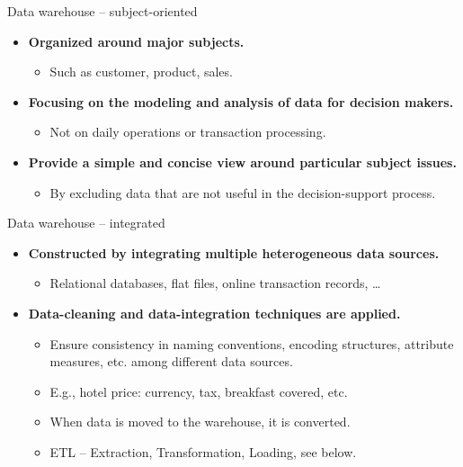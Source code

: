 \documentclass[aspectratio=169,t]{beamer}
\begin{document}
  { 
    \begin{frame}{Data warehouse -- subject-oriented}
        \begin{itemize}
            \item \textbf{Organized around major subjects.}
            \begin{itemize}
              \item Such as customer, product, sales.
            \end{itemize}
            \item \textbf{Focusing on the modeling and analysis of data for {\color{airforceblue}decision makers}.}
            \begin{itemize}
              \item Not on daily operations or transaction processing.
            \end{itemize}
            \item \textbf{Provide a simple and concise view around particular subject issues.}
            \begin{itemize}
              \item By excluding data that are not useful in the decision-support process.
            \end{itemize}
        \end{itemize}
    \end{frame}
  }

  { 
    \begin{frame}{Data warehouse -- integrated}
        \begin{itemize}
            \item \textbf{Constructed by {\color{airforceblue}integrating multiple heterogeneous data sources}.}
            \begin{itemize}
              \item Relational databases, flat files, online transaction records, \ldots
            \end{itemize}
            \item \textbf{Data-cleaning and data-integration techniques are applied.}
            \begin{itemize}
              \item Ensure consistency in naming conventions, encoding structures, attribute measures, etc. among different data sources.
              \item E.g., hotel price: currency, tax, breakfast covered, etc.
              \item When data is moved to the warehouse, it is converted.
              \item ETL -- Extraction, Transformation, Loading, see below.
            \end{itemize}
        \end{itemize}
    \end{frame}
  }
\end{document}
